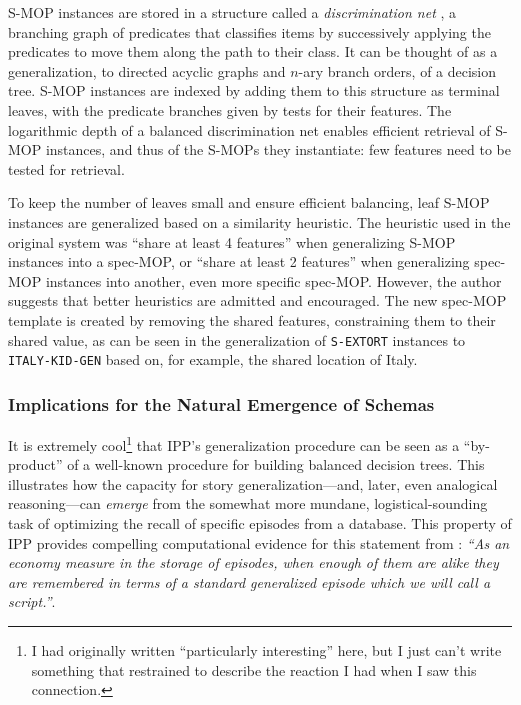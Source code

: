 S-MOP instances are stored in a structure called a \textit{discrimination net} \citep{Charniak:1980:AIP:576572}, a branching graph of predicates that classifies items by successively applying the predicates to move them along the path to their class. It can be thought of as a generalization, to directed acyclic graphs and $n$-ary branch orders, of a decision tree. S-MOP instances are indexed by adding them to this structure as terminal leaves, with the predicate branches given by tests for their features. The logarithmic depth of a balanced discrimination net enables efficient retrieval of S-MOP instances, and thus of the S-MOPs they instantiate: few features need to be tested for retrieval.

To keep the number of leaves small and ensure efficient balancing, leaf S-MOP instances are generalized based on a similarity heuristic. The heuristic used in the original system was ``share at least 4 features'' when generalizing S-MOP instances into a spec-MOP, or ``share at least 2 features'' when generalizing spec-MOP instances into another, even more specific spec-MOP. However, the author suggests that better heuristics are admitted and encouraged. The new spec-MOP template is created by removing the shared features, constraining them to their shared value, as can be seen in the generalization of \texttt{S-EXTORT} instances to \texttt{ITALY-KID-GEN} based on, for example, the shared location of Italy.

\subsubsection{Implications for the Natural Emergence of Schemas}
It is extremely cool\footnote{I had originally written ``particularly interesting'' here, but I just can't write something that restrained to describe the reaction I had when I saw this connection.} that IPP's generalization procedure can be seen as a ``by-product'' of a well-known procedure for building balanced decision trees. This illustrates how the capacity for story generalization---and, later, even analogical reasoning---can \textit{emerge} from the somewhat more mundane, logistical-sounding task of optimizing the recall of specific episodes from a database. This property of IPP provides compelling computational evidence for this statement from \citep{schankandabelson}: \textit{``As an economy measure in the storage of episodes, when enough of them are alike they are remembered in terms of a standard generalized episode which we will call a script.''}.

